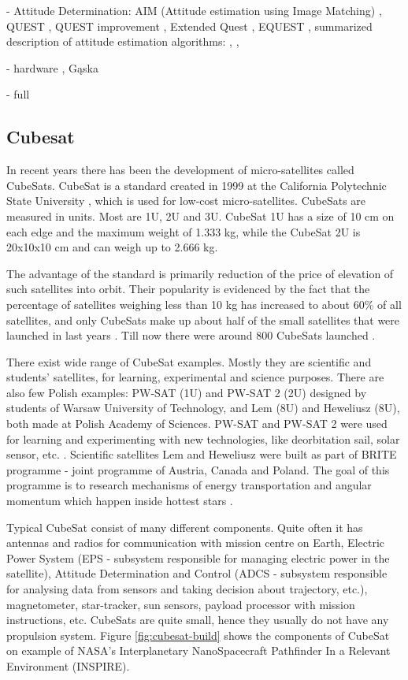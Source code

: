 \documentclass[12pt,a4paper,oneside]{article}
\begin{document}
- Attitude Determination: AIM (Attitude estimation using Image Matching) \citep{delabie2012highly}, QUEST \citep{shuster1990kalman}, QUEST improvement \citep{RIS_1}, Extended Quest \citep{psiaki1999extended}, EQUEST \citep{rinnan2012development}, summarized description of attitude estimation algorithms: \citep{markley1999estimate}, \citep{hall2003spacecraft}, 

- hardware \citep{azizabadi2014vlsi}, Gąska

- full

\subsection{Cubesat}


In recent years there has been the development of micro-satellites called CubeSats. CubeSat is a standard created in 1999 at the California Polytechnic State University \cite{heidt2000cubesat}, which is used for low-cost micro-satellites. CubeSats are measured in units. Most are 1U, 2U and 3U. CubeSat 1U has a size of 10 cm on each edge and the maximum weight of 1.333 kg, while the CubeSat 2U is 20x10x10 cm and can weigh up to 2.666 kg.

The advantage of the standard is primarily reduction of the price of elevation of such satellites into orbit. Their popularity is evidenced by the fact that the percentage of satellites weighing less than 10 kg has increased to about 60\% of all satellites, and only CubeSats make up about half of the small satellites that were launched in last years \cite{swartwout2011brief}. Till now there were around 800 CubeSats launched \cite{nanosats}.

There exist wide range of CubeSat examples. Mostly they are scientific and students' satellites, for learning, experimental and science purposes. There are also few Polish examples: PW-SAT (1U) and PW-SAT 2 (2U) designed by students of Warsaw University of Technology, and Lem (8U) and Heweliusz (8U), both made at Polish Academy of Sciences. PW-SAT and PW-SAT 2 were used for learning and experimenting with new technologies, like deorbitation sail, solar sensor, etc. \cite{pw-sat2}.
Scientific satellites Lem and Heweliusz were built as part of BRITE programme - joint programme of Austria, Canada and Poland. The goal of this programme is to research mechanisms of energy transportation and angular momentum which happen inside hottest stars \cite{brite-pl}.

Typical CubeSat consist of many different components. Quite often it has antennas and radios for communication with mission centre on Earth, Electric Power System (EPS - subsystem responsible for managing electric power in the satellite), Attitude Determination and Control (ADCS - subsystem responsible for analysing data from sensors and taking decision about trajectory, etc.), magnetometer, star-tracker, sun sensors, payload processor with mission instructions, etc. CubeSats are quite small, hence they usually do not have any propulsion system. Figure \ref{fig:cubesat-build} shows the components of CubeSat on example of NASA's Interplanetary NanoSpacecraft Pathfinder In a Relevant Environment (INSPIRE).
\end{document}
